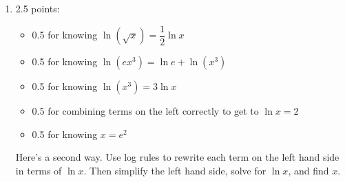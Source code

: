 \documentclass{article}
\begin{document}
\begin{enumerate}
\begin{enumerate}
    \begin{problem}[\stretch{1.25}]
      Here's one way. First use log rules to rewrite the left hand side as a single logarithm (so the equation looks like $\ln(\text{stuff}) = 4$). Then raise $e$ to both sides of the equation, and find $x$. Please simplify your answer.
    \end{problem}

    \begin{solution}
      \begin{align*}
        \ln\!\left( \sqrt{x} \right) + \ln\!\left( ex^3 \right) - 2\ln x 
        &= 4 \\
        \ln\!\left( \sqrt{x} \right) + \ln\!\left( ex^3 \right) - 
        \ln\!\left( x^2 \right) &= 4 \\
        \ln\!\left(\frac{\sqrt{x} \cdot ex^3}{x^2}\right) &= 4 \\
        \ln\!\left(ex^{3/2}\right) &= 4 \\
        e^{\ln(ex^{3/2})} &= e^4 \\
        ex^{3/2} &= e^4 \\
        x^{3/2} &= e^3 \\
        x &= (e^3)^{2/3} \\
        x &= \boxed{e^2}
      \end{align*}
    \end{solution}

  \item

    \begin{grading}
      2.5 points:
      \begin{itemize}[nosep]
      \item 0.5 for knowing $\ln \left( \sqrt{x} \right) = \dfrac{1}{2} \ln x$
      \item 0.5 for knowing $\ln \left( ex^3 \right) = \ln e + \ln \left( x^3 \right)$
      \item 0.5 for knowing $\ln \left( x^3 \right) = 3 \ln x$
      \item 0.5 for combining terms on the left correctly to get to $\ln x = 2$ 
      \item 0.5 for knowing $x = e^2$
      \end{itemize}
    \end{grading}

    \begin{problem}[\vfill]
      Here's a second way. Use log rules to rewrite each term on the left hand side in terms of $\ln x$. Then simplify the left hand side, solve for $\ln x$, and find $x$. 
    \end{problem}


\end{enumerate}
\end{enumerate}
\end{document}
